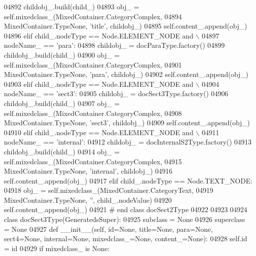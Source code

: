 \begin{DoxyCode}
{{{{{{{{{{{{{{{{{{{{{{{{{{{{{{{{{{{{{{{{{{{{{{{{{{{{{{{{{{{{{{{{{{{{{{{{{{{{{{{{{{{{{{{{{{{{{{{{{{{{{{{{{{{{{{{{{{{{{{{{{{{{{{{{{{{{{{{{{{{{{{{{{{{{{{{{{{{{{{{{{{{{{{{{{{{{{{{{{{{{{{{{{{{{{{{{{{{{{{{{{{{{{{{{{{{{{{{{{{{{{{{{{{{{{{{{{{{{{{{{{{{{{{{{{{{{{{{{{{{{{{{{{{{{{{{{{{{{{{{{{{{{{{{{{{{{{{{{{{{{{{{{{{{{{{{{{{{{{{{{{{{{{{{{04892             childobj\_.build(child\_)
04893             obj\_ = self.mixedclass_(MixedContainer.CategoryComplex,
04894                 MixedContainer.TypeNone, \textcolor{stringliteral}{'title'}, childobj\_)
04895             self.content\_.append(obj\_)
04896         \textcolor{keywordflow}{elif} child\_.nodeType == Node.ELEMENT\_NODE \textcolor{keywordflow}{and} \(\backslash\)
04897             nodeName\_ == \textcolor{stringliteral}{'para'}:
04898             childobj\_ = docParaType.factory()
04899             childobj\_.build(child\_)
04900             obj\_ = self.mixedclass_(MixedContainer.CategoryComplex,
04901                 MixedContainer.TypeNone, \textcolor{stringliteral}{'para'}, childobj\_)
04902             self.content\_.append(obj\_)
04903         \textcolor{keywordflow}{elif} child\_.nodeType == Node.ELEMENT\_NODE \textcolor{keywordflow}{and} \(\backslash\)
04904             nodeName\_ == \textcolor{stringliteral}{'sect3'}:
04905             childobj\_ = docSect3Type.factory()
04906             childobj\_.build(child\_)
04907             obj\_ = self.mixedclass_(MixedContainer.CategoryComplex,
04908                 MixedContainer.TypeNone, \textcolor{stringliteral}{'sect3'}, childobj\_)
04909             self.content\_.append(obj\_)
04910         \textcolor{keywordflow}{elif} child\_.nodeType == Node.ELEMENT\_NODE \textcolor{keywordflow}{and} \(\backslash\)
04911             nodeName\_ == \textcolor{stringliteral}{'internal'}:
04912             childobj\_ = docInternalS2Type.factory()
04913             childobj\_.build(child\_)
04914             obj\_ = self.mixedclass_(MixedContainer.CategoryComplex,
04915                 MixedContainer.TypeNone, \textcolor{stringliteral}{'internal'}, childobj\_)
04916             self.content\_.append(obj\_)
04917         \textcolor{keywordflow}{elif} child\_.nodeType == Node.TEXT\_NODE:
04918             obj\_ = self.mixedclass_(MixedContainer.CategoryText,
04919                 MixedContainer.TypeNone, \textcolor{stringliteral}{''}, child\_.nodeValue)
04920             self.content\_.append(obj\_)
04921 \textcolor{comment}{# end class docSect2Type}
04922 
04923 
04924 \textcolor{keyword}{class }docSect3Type(GeneratedsSuper):
04925     subclass = \textcolor{keywordtype}{None}
04926     superclass = \textcolor{keywordtype}{None}
04927     \textcolor{keyword}{def }__init__(self, id=None, title=None, para=None, sect4=None, internal=None, mixedclass\_=None, 
      content\_=None):
04928         self.id = id
04929         \textcolor{keywordflow}{if} mixedclass\_ \textcolor{keywordflow}{is} \textcolor{keywordtype}{None}:
}}}}}}}}}}}}}}}}}}}}}}}}}}}}}}}}}}}}}}}}}}}}}}}}}}}}}}}}}}}}}}}}}}}}}}}}}}}}}}}}}}}}}}}}}}}}}}}}}}}}}}}}}}}}}}}}}}}}}}}}}}}}}}}}}}}}}}}}}}}}}}}}}}}}}}}}}}}}}}}}}}}}}}}}}}}}}}}}}}}}}}}}}}}}}}}}}}}}}}}}}}}}}}}}}}}}}}}}}}}}}}}}}}}}}}}}}}}}}}}}}}}}}}}}}}}}}}}}}}}}}}}}}}}}}}}}}}}}}}}}}}}}}}}}}}}}}}}}}}}}}}}}}}}}}}}}}}}}}}}}}}}}}}}}
\end{DoxyCode}
